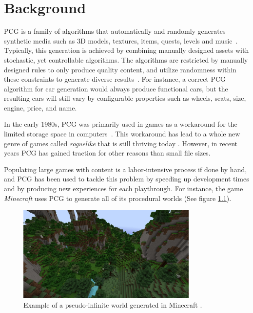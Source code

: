 \chapter{Background}


PCG is a family of algorithms that automatically and randomly generates synthetic media such as 3D models, textures, items, quests, levels and music~\cite[p.1]{pcg_in_games}.
Typically, this generation is achieved by combining manually designed assets with stochastic, yet controllable algorithms.
The algorithms are restricted by manually designed rules to only produce quality content, and utilize randomness within these constraints to generate diverse results~\cite{gamasutra}.
For instance, a correct PCG algorithm for car generation would always produce functional cars, but the resulting cars will still vary by configurable properties such as wheels, seats, size, engine, price, and name.

In the early 1980s, PCG was primarily used in games as a workaround for the limited storage space in computers~\cite[p.4]{pcg_in_games}.
This workaround has lead to a whole new genre of games called \textit{roguelike} that is still thriving today \cite{roguelikes}.
However, in recent years PCG has gained traction for other reasons than small file sizes.

Populating large games with content is a labor-intensive process if done by hand, and PCG has been used to tackle this problem by speeding up development times and by producing new experiences for each playthrough.
For instance, the game \textit{Minecraft} \cite{minecraft} uses PCG to generate all of its procedural worlds (See figure \ref{fig:minecraft}).

\begin{figure}[h!]
  \centering

  \includegraphics[width=0.8\textwidth]{figure/minecraft.jpg}
  \caption{Example of a pseudo-infinite world generated in Minecraft \cite{minecraft_img}.}

  \label{fig:minecraft}
\end{figure}

